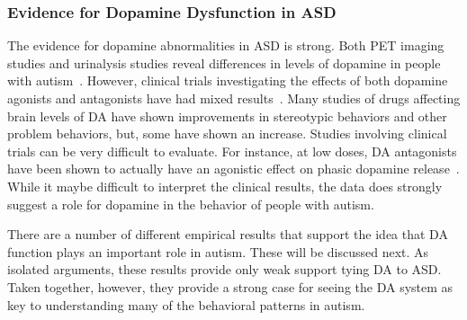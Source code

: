 \documentclass[man]{apa}
\begin{document}
\subsubsection{Evidence for Dopamine Dysfunction in ASD}
The evidence for dopamine abnormalities in ASD is strong. Both PET imaging studies and urinalysis studies reveal differences in levels of dopamine in people with autism~\cite{FernellE:1997:AutismPET,MartineauJ:1992:AutismDopamine}.  However, clinical trials investigating the effects of both dopamine agonists and antagonists have had mixed results~\cite{PoseyDJ:2000:AutismDopamine,TsaiLY:1999:AutismDopamine}.  Many studies of drugs affecting brain levels of DA have shown improvements in stereotypic behaviors and other problem behaviors, but, some have shown an increase.  Studies involving clinical trials can be very difficult to evaluate.  For instance, at low doses, DA antagonists have been shown to actually have an agonistic effect on phasic dopamine release~\cite{RefWorks:157}.  While it maybe difficult to interpret the clinical results, the data does strongly suggest a role for dopamine in the behavior of people with autism.  

There are a number of different empirical results that support the idea that DA function plays an important role in autism.  These will be discussed next.  As isolated arguments, these results provide only weak support tying DA to ASD.  Taken together, however, they provide a strong case for seeing the DA system as key to understanding many of the behavioral patterns in autism. 

\end{document}
